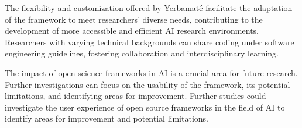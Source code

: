 The flexibility and customization offered by Yerbamaté facilitate the adaptation of the framework to meet researchers' diverse needs, contributing to the development of more accessible and efficient AI research environments. Researchers with varying technical backgrounds can share coding under software engineering guidelines, fostering collaboration and interdisciplinary learning.


The impact of open science frameworks in AI is a crucial area for future research. Further investigations can focus on the usability of the framework, its potential limitations, and identifying areas for improvement. Further studies could investigate the user experience of open source frameworks in the field of AI to identify areas for improvement and potential limitations.

 
